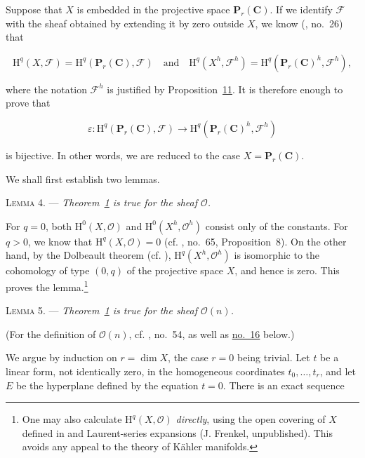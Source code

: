 
Suppose that $X$ is embedded in the projective space $\mathbf{P}_r(\mathbf{C})$. If we identify $\mathcal{F}$ with the sheaf obtained by extending it by zero outside $X$, we know (, no.~26) that

\begin{equation*}
\mathrm{H}^q(X,\mathcal{F})=\mathrm{H}^q(\mathbf{P}_r(\mathbf{C}),\mathcal{F})
\quad\text{and}\quad
\mathrm{H}^q(X^h,\mathcal{F}^h)=
\mathrm{H}^q(\mathbf{P}_r(\mathbf{C})^h,\mathcal{F}^h),
\end{equation*}

where the notation $\mathcal{F}^h$ is justified by Proposition~\hyperref[gaga:prop:11]{11}. It is therefore enough to prove that

\begin{equation*}
\varepsilon:\mathrm{H}^q(\mathbf{P}_r(\mathbf{C}),\mathcal{F})
\longrightarrow
\mathrm{H}^q(\mathbf{P}_r(\mathbf{C})^h,\mathcal{F}^h)
\end{equation*}

is bijective. In other words, we are reduced to the case $X=\mathbf{P}_r(\mathbf{C})$.

We shall first establish two lemmas.

\textsc{Lemma 4}. --- \emph{Theorem~\hyperref[gaga:thm:1]{1} is true for the sheaf $\mathcal{O}$.}

For $q=0$, both $\mathrm{H}^0(X,\mathcal{O})$ and $\mathrm{H}^0(X^h,\mathcal{O}^h)$ consist only of the constants. For $q>0$, we know that $\mathrm{H}^q(X,\mathcal{O})=0$ (cf. , no.~65, Proposition~8). On the other hand, by the Dolbeault theorem (cf. ), $\mathrm{H}^q(X^h,\mathcal{O}^h)$ is isomorphic to the cohomology of type $(0,q)$ of the projective space $X$, and hence is zero. This proves the lemma.\footnote{One may also calculate $\mathrm{H}^q(X,\mathcal{O})$ \emph{directly}, using the open covering of $X$ defined in  and Laurent-series expansions (J. Frenkel, unpublished). This avoids any appeal to the theory of Kähler manifolds.}

\textsc{Lemma 5}. --- \emph{Theorem~\hyperref[gaga:thm:1]{1} is true for the sheaf $\mathcal{O}(n)$.}

(For the definition of $\mathcal{O}(n)$, cf. , no.~54, as well as \hyperref[gaga:no:16]{no.~16} below.)

We argue by induction on $r=\dim X$, the case $r=0$ being trivial. Let $t$ be a linear form, not identically zero, in the homogeneous coordinates $t_0,\ldots,t_r$, and let $E$ be the hyperplane defined by the equation $t=0$. There is an exact sequence

